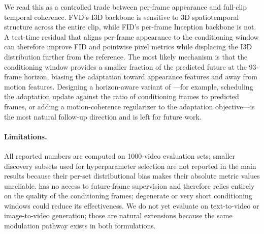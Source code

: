 We read this as a controlled trade between per-frame appearance and full-clip
temporal coherence. FVD's I3D backbone is sensitive to 3D spatiotemporal
structure across the entire clip, while FID's per-frame Inception backbone is
not. A test-time residual that aligns per-frame appearance to the conditioning
window can therefore improve FID and pointwise pixel metrics while displacing
the I3D distribution further from the reference. The most likely mechanism is
that the conditioning window provides a smaller fraction of the predicted
future at the 93-frame horizon, biasing the adaptation toward appearance
features and away from motion features. Designing a horizon-aware variant of
\method---for example, scheduling the adaptation update against the ratio of
conditioning frames to predicted frames, or adding a motion-coherence
regularizer to the adaptation objective---is the most natural follow-up
direction and is left for future work.

\paragraph{Limitations.}
All reported numbers are computed on 1000-video evaluation sets; smaller
discovery subsets used for hyperparameter selection are not reported in the
main results because their per-set distributional bias makes their absolute
metric values unreliable. \method has no access to future-frame supervision
and therefore relies entirely on the quality of the conditioning frames;
degenerate or very short conditioning windows could reduce its effectiveness.
We do not yet evaluate \method on text-to-video or image-to-video generation;
those are natural extensions because the same modulation pathway exists in
both formulations.
